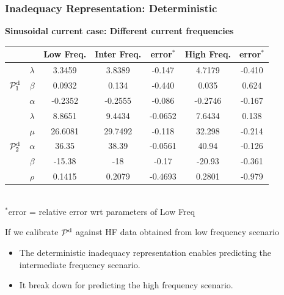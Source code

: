 \documentclass[10pt,xcolor=dvipsnames,compress]{beamer}
\begin{document}
\begin{frame}
\frametitle{Inadequacy Representation: Deterministic}

\textbf{Sinusoidal current case: Different current frequencies}


\vfill

\begin{table}
\centering
\begin{tabular}{cc|c|cc|cc}
\cline{3-7}
                                      &         & Low Freq. & Inter Freq. & error$^*$ & High Freq. & error$^*$ \\ \hline
\multicolumn{1}{c|}{} & $\lambda$ & 3.3459 & 3.8389 & -0.147 & 4.7179 & -0.410\\
\multicolumn{1}{c|}{$\mathcal{P}_1^{\rm d}$} & $\beta$ & 0.0932 & 0.134 & -0.440 & 0.035 & 0.624 \\
\multicolumn{1}{c|}{}  & $\alpha$ & -0.2352 & -0.2555 & -0.086	& -0.2746	& -0.167 \\ \hline
\multicolumn{1}{c|}{} & $\lambda$ & 8.8651 &  9.4434  & -0.0652 &  7.6434 & 0.138 \\
\multicolumn{1}{c|}{}  &$\mu	$ & 26.6081 & 29.7492  & -0.118 & 32.298 & -0.214 \\
\multicolumn{1}{c|}{$\mathcal{P}_2^{\rm d}$}  &$\alpha$ & 36.35 & 38.39 & -0.0561 & 40.94	& -0.126  \\
\multicolumn{1}{c|}{}  &$\beta$	& -15.38 &  -18	& -0.17 & -20.93 & -0.361  \\
\multicolumn{1}{c|}{}   &$\rho$	& 0.1415	& 0.2079	& -0.4693	& 0.2801	& -0.979  \\ \hline
\end{tabular}
\\$^*${\small error = relative error wrt parameters of Low Freq}
\end{table}

If we calibrate $\mathcal{P}^{\rm d}$ against HF data obtained from low frequency scenario
\begin{itemize}
\item The deterministic inadequacy representation enables predicting the intermediate frequency scenario. 
\item It break down for predicting the high frequency scenario. 
\end{itemize}

\vfill
\end{frame}
\end{document}
